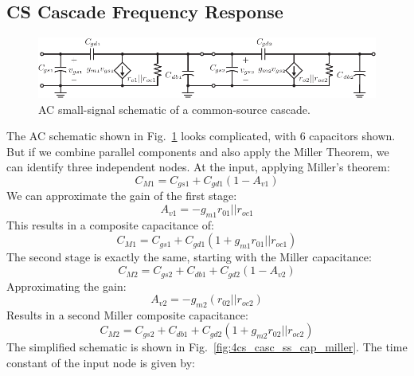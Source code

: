 \subsection{CS Cascade Frequency Response}
\begin{figure}[tb]
\centering
\includegraphics[scale=1]{3cs_casc_ss_cap}
\caption{AC small-signal schematic of a common-source cascade.}
\label{fig:3cs_casc_ss_cap}
\end{figure}
The AC schematic shown in Fig.~\ref{fig:3cs_casc_ss_cap} looks complicated, with 6 capacitors shown.  But if we combine parallel components and also apply the Miller Theorem, we can identify three independent nodes.  At the input, applying Miller's theorem:
    \begin{equation} 
        C_{M1} = C_{gs1} + C_{gd1} (1 - A_{v1}) 
    \end{equation}
We can approximate the gain of the first stage:
    \begin{equation} 
        A_{v1} = -g_{m1} r_{01}||r_{oc1} 
    \end{equation}
This results in a composite capacitance of:
    \begin{equation} 
        C_{M1} = C_{gs1} + C_{gd1} (1 + g_{m1} r_{01}||r_{oc1}) 
    \end{equation}
The second stage is exactly the same, starting with the Miller capacitance:
    \begin{equation} 
        C_{M2} = C_{gs2} + C_{db1} + C_{gd2} (1 - A_{v2}) 
    \end{equation}
Approximating the gain:
    \begin{equation} 
        A_{v2} = -g_{m2} (r_{02}||r_{oc2})
    \end{equation}
Results in a second Miller composite capacitance:
    \begin{equation} 
        C_{M2} = C_{gs2} + C_{db1} + C_{gd2} (1 + g_{m2} r_{02}||r_{oc2}) 
    \end{equation}
The simplified schematic is shown in Fig.~\ref{fig:4cs_casc_ss_cap_miller}.  The time constant of the input node is given by:
